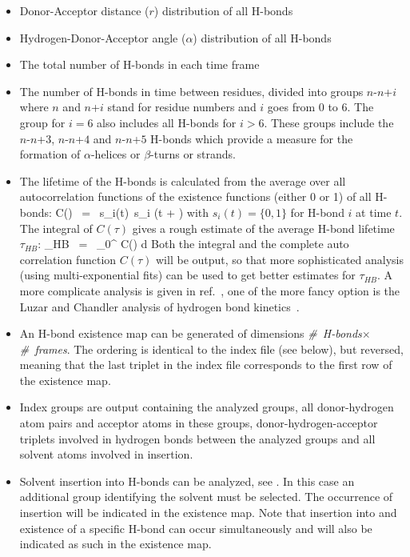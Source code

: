 \begin{itemize}
\item
Donor-Acceptor distance ($r$) distribution of all H-bonds
\item
Hydrogen-Donor-Acceptor angle ($\alpha$) distribution of all H-bonds 
\item
The total number of H-bonds in each time frame
\item
\newcommand{\nn}[1]{$n$-$n$+$#1$}
The number of H-bonds in time between residues, divided into groups
\nn{i} where $n$ and $n$+$i$ stand for residue numbers and $i$ goes
from 0 to 6. The group for $i=6$ also includes all H-bonds for
$i>6$. These groups include the \nn{3}, \nn{4} and \nn{5} H-bonds
which provide a measure for the formation of $\alpha$-helices or
$\beta$-turns or strands.
\item
The lifetime of the H-bonds is calculated from the average over all
autocorrelation functions of the existence functions (either 0 or 1)
of all H-bonds:
\beq
C(\tau) ~=~ \langle s_i(t)~s_i (t + \tau) \rangle
\label{eqn:hbcorr}
\eeq
with $s_i(t) = \{0,1\}$ for H-bond $i$ at time $t$. The integral of
$C(\tau)$ gives a rough estimate of the average H-bond lifetime
$\tau_{HB}$:
\beq
\tau_{HB} ~=~ \int_{0}^{\infty} C(\tau) d\tau
\label{eqn:hblife}
\eeq
Both the integral and the complete auto correlation function $C(\tau)$
will be output, so that more sophisticated analysis ({\eg}\@ using
multi-exponential fits) can be used to get better estimates for
$\tau_{HB}$. A more complicate analysis is given in ref.~\cite{Spoel2006b},
one of the more fancy option is the Luzar and Chandler analysis
of hydrogen bond kinetics~\cite{Luzar96b,Luzar2000a}. 
\item
An H-bond existence map can be generated of dimensions {\em
\#~H-bonds}$\times${\em \#~frames}. The ordering is identical to the index 
file (see below), but reversed, meaning that the last triplet in the index
file corresponds to the first row of the existence map.
\item
Index groups are output containing the analyzed groups, all
donor-hydrogen atom pairs and acceptor atoms in these groups,
donor-hydrogen-acceptor triplets involved in hydrogen bonds between
the analyzed groups and all solvent atoms involved in insertion.
\item
Solvent insertion into H-bonds can be analyzed, see
. In this case an additional group identifying
the solvent must be selected. The occurrence of insertion will be
indicated in the existence map. Note that insertion into and existence
of a specific H-bond can occur simultaneously and will also be
indicated as such in the existence map.
\end{itemize}

